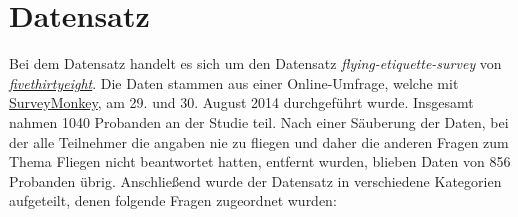 \documentclass{scrartcl}
\begin{document}
\section{Datensatz} \label{Datensatz}
Bei dem Datensatz handelt es sich um den Datensatz \textit{flying-etiquette-survey} von \textit{\href{https://github.com/fivethirtyeight/data/tree/master/flying-etiquette-survey}{fivethirtyeight}}. Die Daten stammen aus einer Online-Umfrage, welche mit \href{https://www.surveymonkey.com/mp/audience/}{SurveyMonkey}, am 29. und 30. August 2014 durchgeführt wurde. Insgesamt nahmen 1040 Probanden an der Studie teil. Nach einer Säuberung der Daten, bei der alle Teilnehmer die angaben nie zu fliegen und daher die anderen Fragen zum Thema Fliegen nicht beantwortet hatten, entfernt wurden, blieben Daten von 856 Probanden übrig. 
\newline \newline
Anschließend wurde der Datensatz in verschiedene Kategorien aufgeteilt, denen folgende Fragen zugeordnet wurden:
\end{document}
